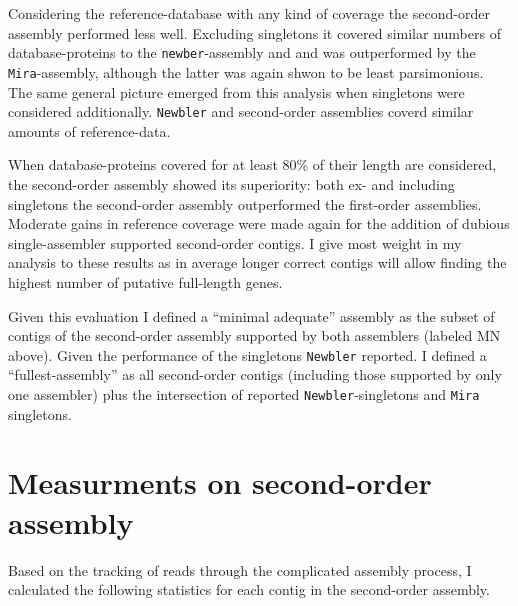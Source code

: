 
Considering the reference-database with any kind of coverage the
second-order assembly performed less well. Excluding singletons it
covered similar numbers of database-proteins to the
\texttt{newber}-assembly and and was outperformed by the
\texttt{Mira}-assembly, although the latter was again shwon to be
least parsimonious. The same general picture emerged from this
analysis when singletons were considered
additionally. \texttt{Newbler} and second-order assemblies coverd
similar amounts of reference-data.


When database-proteins covered for at least 80\% of their length are
considered, the second-order assembly showed its superiority: both ex-
and including singletons the second-order assembly outperformed the
first-order assemblies. Moderate gains in reference coverage were made
again for the addition of dubious single-assembler supported
second-order contigs. I give most weight in my analysis to these
results as in average longer correct contigs will allow finding the
highest number of putative full-length genes.

Given this evaluation I defined a ``minimal adequate'' assembly as the
subset of contigs of the second-order assembly supported by both
assemblers (labeled MN above). Given the performance of the singletons
\texttt{Newbler} reported. I defined a ``fullest-assembly'' as all
second-order contigs (including those supported by only one assembler)
plus the intersection of reported \texttt{Newbler}-singletons and
\texttt{Mira} singletons.

\section{Measurments on second-order assembly}

Based on the tracking of reads through the complicated assembly
process, I calculated the following statistics for each contig in the
second-order assembly.

